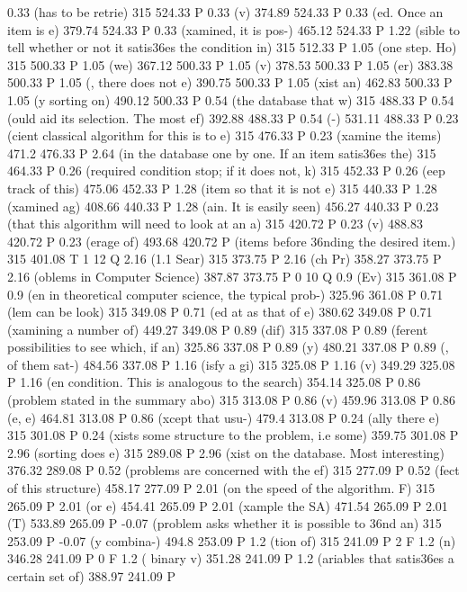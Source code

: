 0.33 (has to be retrie) 315 524.33 P
0.33 (v) 374.89 524.33 P
0.33 (ed. Once an item is e) 379.74 524.33 P
0.33 (xamined, it is pos-) 465.12 524.33 P
1.22 (sible to tell whether or not it satis\336es the condition in) 315 512.33 P
1.05 (one step. Ho) 315 500.33 P
1.05 (we) 367.12 500.33 P
1.05 (v) 378.53 500.33 P
1.05 (er) 383.38 500.33 P
1.05 (, there does not e) 390.75 500.33 P
1.05 (xist an) 462.83 500.33 P
1.05 (y sorting on) 490.12 500.33 P
0.54 (the database that w) 315 488.33 P
0.54 (ould aid its selection. The most ef) 392.88 488.33 P
0.54 (-) 531.11 488.33 P
0.23 (cient classical algorithm for this is to e) 315 476.33 P
0.23 (xamine the items) 471.2 476.33 P
2.64 (in the database one by one. If an item satis\336es the) 315 464.33 P
0.26 (required condition stop; if it does not, k) 315 452.33 P
0.26 (eep track of this) 475.06 452.33 P
1.28 (item so that it is not e) 315 440.33 P
1.28 (xamined ag) 408.66 440.33 P
1.28 (ain. It is easily seen) 456.27 440.33 P
0.23 (that this algorithm will need to look at an a) 315 420.72 P
0.23 (v) 488.83 420.72 P
0.23 (erage of) 493.68 420.72 P
(items before \336nding the desired item.) 315 401.08 T
1 12 Q
2.16 (1.1 Sear) 315 373.75 P
2.16 (ch Pr) 358.27 373.75 P
2.16 (oblems in Computer Science) 387.87 373.75 P
0 10 Q
0.9 (Ev) 315 361.08 P
0.9 (en in theoretical computer science, the typical prob-) 325.96 361.08 P
0.71 (lem can be look) 315 349.08 P
0.71 (ed at as that of e) 380.62 349.08 P
0.71 (xamining a number of) 449.27 349.08 P
0.89 (dif) 315 337.08 P
0.89 (ferent possibilities to see which, if an) 325.86 337.08 P
0.89 (y) 480.21 337.08 P
0.89 (, of them sat-) 484.56 337.08 P
1.16 (isfy a gi) 315 325.08 P
1.16 (v) 349.29 325.08 P
1.16 (en condition. This is analogous to the search) 354.14 325.08 P
0.86 (problem stated in the summary abo) 315 313.08 P
0.86 (v) 459.96 313.08 P
0.86 (e, e) 464.81 313.08 P
0.86 (xcept that usu-) 479.4 313.08 P
0.24 (ally there e) 315 301.08 P
0.24 (xists some structure to the problem, i.e some) 359.75 301.08 P
2.96 (sorting does e) 315 289.08 P
2.96 (xist on the database. Most interesting) 376.32 289.08 P
0.52 (problems are concerned with the ef) 315 277.09 P
0.52 (fect of this structure) 458.17 277.09 P
2.01 (on the speed of the algorithm. F) 315 265.09 P
2.01 (or e) 454.41 265.09 P
2.01 (xample the SA) 471.54 265.09 P
2.01 (T) 533.89 265.09 P
-0.07 (problem asks whether it is possible to \336nd an) 315 253.09 P
-0.07 (y combina-) 494.8 253.09 P
1.2 (tion of) 315 241.09 P
2 F
1.2 (n) 346.28 241.09 P
0 F
1.2 ( binary v) 351.28 241.09 P
1.2 (ariables that satis\336es a certain set of) 388.97 241.09 P

